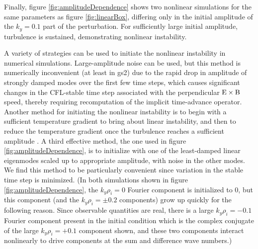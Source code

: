 \documentclass{jpp}
\begin{document}
Finally, figure \ref{fig:amplitudeDependence} shows two nonlinear simulations for the same parameters as figure \ref{fig:linearBox},
differing only in the initial amplitude of the $k_y=0.1$ part of the perturbation.
For sufficiently large initial amplitude, turbulence is sustained,
demonstrating nonlinear instability.

A variety of strategies can be used to initiate the nonlinear instability in numerical simulations.
Large-amplitude noise can be used, but this method is numerically inconvenient (at least in gs2) due to the rapid
drop in amplitude of strongly damped modes over the first few time steps,
which causes significant changes in the CFL-stable time step associated
with the perpendicular $\boldsymbol{$E$}\times\boldsymbol{$B$}$ speed,
thereby requiring recomputation of the implicit time-advance operator.
Another method for initiating the nonlinear instability is to begin with a sufficient
temperature gradient to bring about linear instability, and then to reduce the temperature gradient
once the turbulence reaches a sufficient amplitude \citep{Drake}.
A third effective method, the one used in figure \ref{fig:amplitudeDependence},
is to initialize with one of the least-damped linear eigenmodes scaled up to appropriate amplitude, with noise in the other modes.  
We find this method to be particularly convenient since variation in the stable time step
is minimized.
(In both simulations shown in figure  \ref{fig:amplitudeDependence}, the $k_y \rho_i=0$ Fourier component is initialized to 0,
but this component (and the $k_y \rho_i=\pm 0.2$ components) grow up quickly for the following reason. Since observable quantities are real, there is a large $k_y \rho_i=-0.1$
Fourier component present in the initial condition which is the complex conjugate of the large $k_y \rho_i=+0.1$ component shown,
and these two components interact nonlinearly to drive components at the sum and difference wave numbers.)
\end{document}
